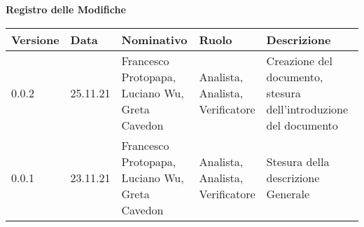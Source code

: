 {\LARGE{\textbf{Registro delle Modifiche}}} \\
\renewcommand{\arraystretch}{2}
\begin{tabular}{|m{}<{\centering}|m{}<{\centering}|m{}<{\centering}|m{}<{\centering}|m{}<{\centering}|}
	\hline \rowcolor{azzurro_scuro!70}
	\textbf{Versione}&\textbf{Data}&\textbf{Nominativo}&\textbf{Ruolo}&\textbf{Descrizione}\\
	\hline
	0.0.2&25.11.21&\shortstack {Francesco Protopapa,\\Luciano Wu,\\Greta Cavedon}&\shortstack{Analista,\\Analista,\\Verificatore}&Creazione del documento, stesura dell’introduzione del documento\\ 
	\hline \rowcolor{azzurro_chiaro!30}
	0.0.1&23.11.21&\shortstack{Francesco Protopapa,\\Luciano Wu,\\Greta Cavedon}&\shortstack{Analista,\\Analista,\\Verificatore}&Stesura della descrizione Generale\\
	\hline
\end{tabular}